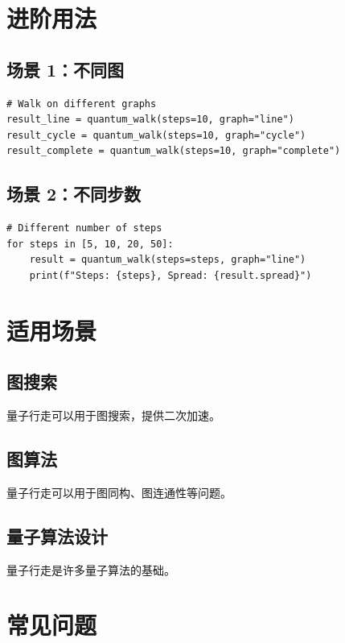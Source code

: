 \documentclass[12pt,a4paper]{article}
\begin{document}
\section{进阶用法}

\subsection{场景 1：不同图}

\begin{lstlisting}[style=python]
# Walk on different graphs
result_line = quantum_walk(steps=10, graph="line")
result_cycle = quantum_walk(steps=10, graph="cycle")
result_complete = quantum_walk(steps=10, graph="complete")
\end{lstlisting}

\subsection{场景 2：不同步数}

\begin{lstlisting}[style=python]
# Different number of steps
for steps in [5, 10, 20, 50]:
    result = quantum_walk(steps=steps, graph="line")
    print(f"Steps: {steps}, Spread: {result.spread}")
\end{lstlisting}

\section{适用场景}

\subsection{图搜索}

量子行走可以用于图搜索，提供二次加速。

\subsection{图算法}

量子行走可以用于图同构、图连通性等问题。

\subsection{量子算法设计}

量子行走是许多量子算法的基础。

\section{常见问题}
\end{document}
